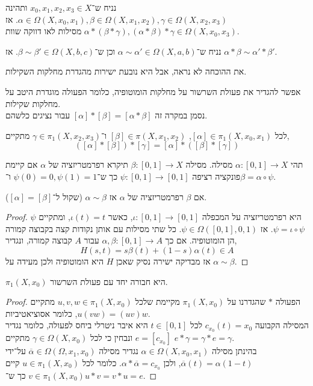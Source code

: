 \begin{remark}
	נניח ש־$x_0, x_1, x_2, x_3 \in X$ ותהינה $\alpha \in \Omega(X, x_0, x_1), \beta \in \Omega(X, x_1, x_2), \gamma \in \Omega(X, x_2, x_3)$.
	אז $\alpha * (\beta * \gamma), (\alpha * \beta) * \gamma \in \Omega(X, x_0, x_3)$ מסילות לאו דווקה שוות.
\end{remark}
\begin{proposition}
	נניח ש־$\alpha \sim \alpha' \in \Omega(X, a, b)$ וכן ש־$\beta \sim \beta' \in \Omega(X, b, c)$.
	אז $\alpha * \beta \sim \alpha' * \beta'$.
\end{proposition}
את ההוכחה לא נראה, אבל היא נובעת ישירות מהגדרת מחלקות השקילות.
\begin{conclusion}
	אפשר להגדיר את פעולת השרשור על מחלקות הומוטופיה, כלומר הפעולה מוגדרת היטב על מחלקות שקילות. \\
	נסמן במקרה זה $[\alpha] * [\beta] = [\alpha * \beta]$ עבור נציגים כלשהם.
\end{conclusion}
\begin{proposition}
	לכל $[\alpha] \in \pi_1(X, x_0, x_1)$, $[\beta] \in \pi(X, x_1, x_2)$ ו־$\gamma \in \pi_1(X, x_2, x_3)$ מתקיים,
	\[
		([\alpha] * [\beta]) * [\gamma]
		= [\alpha] * ([\beta] * [\gamma])
	\]
\end{proposition}
\begin{definition}
	תהי $\alpha : [0, 1] \to X$ מסילה.
	מסילה $\beta : [0, 1] \to X$ תיקרא רפרמטריזציה של $\alpha$ אם קיימת פונקציה רציפה $\psi : [0, 1] \to [0, 1]$ כך ש־$\psi(0) = 0, \psi(1) = 1$ ו־$\beta = \alpha \circ \psi$.
\end{definition}
\begin{proposition}
	אם $\beta$ רפרמטריזציה של $\alpha$ אז $\alpha \sim \beta$ (שקול ל־$[\alpha] = [\beta]$).
\end{proposition}
\begin{proof}
	$\psi$ היא רפרמטריזציה על המכפלה $\iota : [0, 1] \to [0, 1]$, כאשר $\iota(t) = t$, ומתקיים $\psi = \iota \circ \psi$.
	אז $\psi \in \Omega([0, 1], 0, 1)$.
	כל שתי מסילות עם אותן נקודות קצה בקבוצה קמורה הן הומוטופיה.
	אם כך $\alpha, \beta : [0, 1] \to A$ עבור $A$ קבוצה קמורה, ונגדיר,
	\[
		H(s, t)
		= s \beta(t) + (1 - s) \alpha(t) \in A
	\]
	אז מבדיקה ישירה נסיק שאכן $H$ היא הומוטופיה ולכן מעידה על $\alpha \sim \beta$.
\end{proof}
\begin{conclusion}
	$\pi_1(X, x_0)$ היא חבורה יחד עם פעולת השרשור.
\end{conclusion}
\begin{proof}
	הפעולה $*$ שהגדרנו על $\pi_1(X, x_0)$ מקיימת שלכל $u, v, w \in \pi_1(X, x_0)$ מתקיים $u (v w) = (u v) w$, כלומר אסוציאטיביות. \\
	המסילה הקבועה $c_{x_0}(t) = x_0$ לכל $t \in [0, 1]$ היא איבר ניטרלי ביחס לפעולה, כלומר נגדיר $e = [c_{x_0}]$ ונבחין כי לכל $\gamma \in \Omega(X, x_0)$ מתקיים $e * \gamma = \gamma * e = \gamma$. \\
	בהינתן מסילה $\alpha \in \Omega(X, x_0, x_1)$ נגדיר מסילה $\overline{\alpha} \in \Omega(\Omega, x_1, x_0)$ על־ידי $\overline{\alpha}(t) = \alpha(1 - t)$, ולכן $\alpha * \overline{\alpha} = c_{x_0}$.
	כלומר לכל $u \in \pi_1(X, x_0)$ קיים $v \in \pi_1(X, x_0)$ כך ש־$u * v = v * u = e$.
\end{proof}
